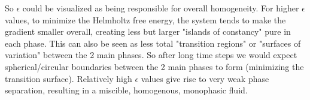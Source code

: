 \documentclass[a4paper]{article}
\begin{document}
So $\epsilon$ could be visualized as being responsible for overall homogeneity.
For higher $\epsilon$ values, to minimize the Helmholtz free energy, the system tends to make the gradient smaller overall, creating less but larger "islands of constancy" pure in each phase.
This can also be seen as less total "transition regions" or "surfaces of variation" between the 2 main phases.
So after long time steps we would expect spherical/circular boundaries between the 2 main phases to form (minimizing the transition surface).
Relatively high $\epsilon$ values give rise to very weak phase separation, resulting in a miscible, homogenous, monophasic fluid.
\end{document}
